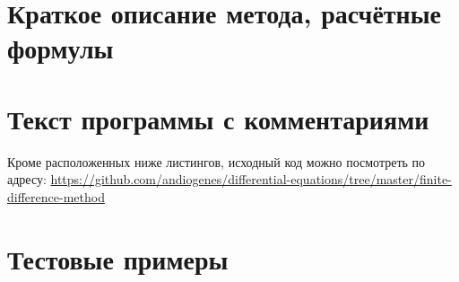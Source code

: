 \documentclass[a4paper,12pt]{article}
\begin{document}
\section{\normalsize{Краткое описание метода, расчётные формулы}}
\begin{flushleft}
\end{flushleft}


\section{\normalsize{Текст программы с комментариями}}
Кроме расположенных ниже листингов, исходный код можно посмотреть по адресу: \url{https://github.com/andiogenes/differential-equations/tree/master/finite-difference-method}

\section{\normalsize{Тестовые примеры}}
\end{document}
